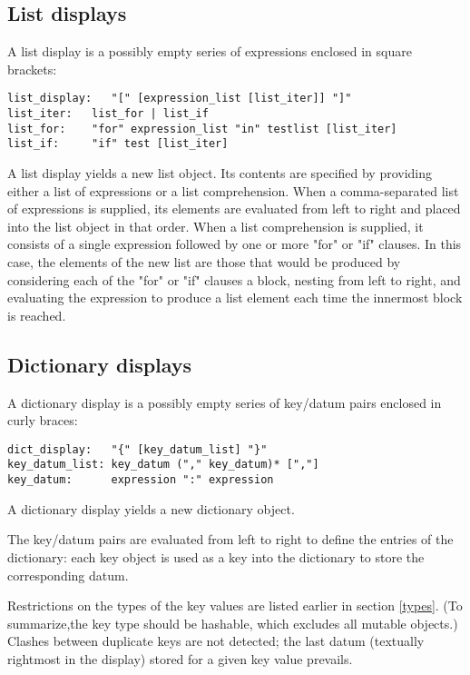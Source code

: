 \subsection{List displays\label{lists}}

A list display is a possibly empty series of expressions enclosed in
square brackets:

\begin{verbatim}
list_display:   "[" [expression_list [list_iter]] "]"
list_iter:   list_for | list_if
list_for:    "for" expression_list "in" testlist [list_iter]
list_if:     "if" test [list_iter]
\end{verbatim}

A list display yields a new list object.  Its contents are specified
by providing either a list of expressions or a list comprehension.
When a comma-separated list of expressions is supplied, its elements are
evaluated from left to right and placed into the list object in that
order.  When a list comprehension is supplied, it consists of a
single expression followed by one or more "for" or "if" clauses.  In this
case, the elements of the new list are those that would be produced
by considering each of the "for" or "if" clauses a block, nesting from
left to right, and evaluating the expression to produce a list element
each time the innermost block is reached.

\subsection{Dictionary displays\label{dict}}

A dictionary display is a possibly empty series of key/datum pairs
enclosed in curly braces:

\begin{verbatim}
dict_display:   "{" [key_datum_list] "}"
key_datum_list: key_datum ("," key_datum)* [","]
key_datum:      expression ":" expression
\end{verbatim}

A dictionary display yields a new dictionary object.

The key/datum pairs are evaluated from left to right to define the
entries of the dictionary: each key object is used as a key into the
dictionary to store the corresponding datum.

Restrictions on the types of the key values are listed earlier in
section \ref{types}.  (To summarize,the key type should be hashable,
which excludes all mutable objects.)  Clashes between duplicate keys
are not detected; the last datum (textually rightmost in the display)
stored for a given key value prevails.

